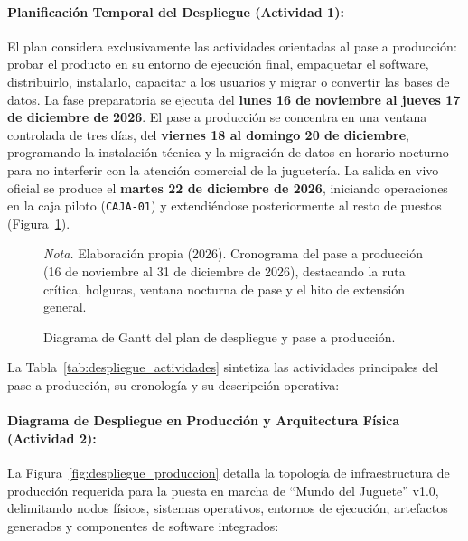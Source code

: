 \documentclass[12pt,a4paper]{article}
\begin{document}
\paragraph{Planificación Temporal del Despliegue (Actividad 1):}
El plan considera exclusivamente las actividades orientadas al pase a producción: probar el producto en su entorno de ejecución final, empaquetar el software, distribuirlo, instalarlo, capacitar a los usuarios y migrar o convertir las bases de datos. La fase preparatoria se ejecuta del \textbf{lunes 16 de noviembre al jueves 17 de diciembre de 2026}. El pase a producción se concentra en una ventana controlada de tres días, del \textbf{viernes 18 al domingo 20 de diciembre}, programando la instalación técnica y la migración de datos en horario nocturno para no interferir con la atención comercial de la juguetería. La salida en vivo oficial se produce el \textbf{martes 22 de diciembre de 2026}, iniciando operaciones en la caja piloto (\texttt{CAJA-01}) y extendiéndose posteriormente al resto de puestos (Figura~\ref{fig:gantt_despliegue}).

\begin{figure}[H]
  \caption{Diagrama de Gantt del plan de despliegue y pase a producción.}
  \label{fig:gantt_despliegue}
  \centering
  \resizebox{\linewidth}{!}{}
  \par\vspace{1ex}
  \raggedright\noindent\small \emph{Nota.} Elaboración propia (2026). Cronograma del pase a producción (16 de noviembre al 31 de diciembre de 2026), destacando la ruta crítica, holguras, ventana nocturna de pase y el hito de extensión general.
\end{figure}

La Tabla~\ref{tab:despliegue_actividades} sintetiza las actividades principales del pase a producción, su cronología y su descripción operativa:



\paragraph{Diagrama de Despliegue en Producción y Arquitectura Física (Actividad 2):}
La Figura~\ref{fig:despliegue_produccion} detalla la topología de infraestructura de producción requerida para la puesta en marcha de ``Mundo del Juguete'' v1.0, delimitando nodos físicos, sistemas operativos, entornos de ejecución, artefactos generados y componentes de software integrados:
\end{document}
